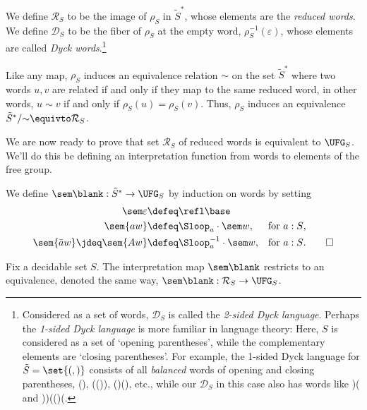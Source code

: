 \begin{definition}
  We define $\mathcal R_S$ to be the image of $\rho_S$ in $\tilde S^*$,
  whose elements are the \emph{reduced words}.
  We define $\mathcal D_S$ to be the fiber of $\rho_S$ at the empty word,
  $\rho_S^{-1}(\varepsilon)$,
  whose elements are called \emph{Dyck words}.\footnote{%
    Considered as a set of words,
    $\mathcal D_S$ is called the \emph{2-sided Dyck language}.
    Perhaps the \emph{1-sided Dyck language} is more familiar
    in language theory: Here, $S$ is considered as a set of
    `opening parentheses', while the complementary elements
    are `closing parentheses'.
    For example, the 1-sided Dyck language for $\tilde S=\set{\textup{(},\textup{)}}$
    consists of all \emph{balanced} words of opening and closing parentheses,
    \eg (), (()), ()(), etc., while our $\mathcal D_S$ in this case
    also has words like )( and ))(()(.}
\end{definition}

\begin{remark}
  Like any map, $\rho_S$ induces an equivalence relation $\sim$
  on the set $\tilde S^*$
  where two words $u,v$ are related
  if and only if they map to the same reduced word,
  in other words,
  $u \sim v$ if and only if $\rho_S(u) = \rho_S(v)$.
  Thus, $\rho_S$ induces an equivalence $\tilde S^*/{\sim} \equivto \mathcal R_S$.
\end{remark}

We are now ready to prove that set $\mathcal R_S$ of reduced words
is equivalent to $\UFG_S$.
We'll do this be defining an interpretation function from words
to elements of the free group.

\begin{definition}
  We define $\sem\blank : \tilde S^* \to \UFG_S$
  by induction on words by setting
  \begin{align*}
    \sem\varepsilon             &\defeq \refl\base & & \\
    \sem{aw}                    &\defeq \Sloop_a \cdot \sem w,
                                &\text{for $a:S$,}& \\
    \sem{\bar aw}\jdeq \sem{Aw} &\defeq \Sloop_a^{-1} \cdot \sem w,
                                &\text{for $a:S$.}&\qedhere
  \end{align*}
\end{definition}

\begin{theorem}\label{thm:free-group-elements}
  Fix a decidable set $S$.
  The interpretation map $\sem\blank$ restricts to
  an equivalence, denoted the same way,
  $\sem\blank : \mathcal R_S \to \UFG_S$.
\end{theorem}

